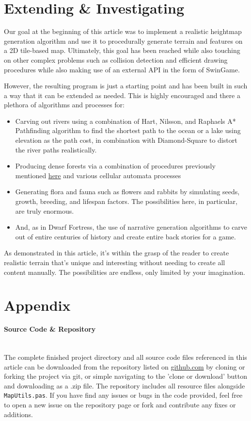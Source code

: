 \documentclass{article}
\begin{document}
\section{Extending \& Investigating}
Our goal at the beginning of this article was to implement a realistic heightmap generation algorithm and use it to procedurally generate terrain and features on a 2D tile-based map. Ultimately, this goal has been reached while also touching on other complex problems such as collision detection and efficient drawing procedures while also making use of an external API in the form of SwinGame.
\par
However, the resulting program is just a starting point and has been built in such a way that it can be extended as needed. This is highly encouraged and there a plethora of algorithms and processes for:
\begin{itemize}
\item
Carving out rivers using a combination of Hart, Nilsson, and Raphaels A* Pathfinding algorithm \parencite{astar} to find the shortest path to the ocean or a lake using elevation as the path cost, in combination with Diamond-Square to distort the river paths realistically.
\item
Producing dense forests via a combination of procedures previously mentioned \hyperref[forestalgo]{here} and various cellular automata processes
\item
Generating flora and fauna such as flowers and rabbits by simulating seeds, growth, breeding, and lifespan factors. The possibilities here, in particular, are truly enormous.
\item
And, as in Dwarf Fortress, the use of narrative generation algorithms to carve out of entire centuries of history and create entire back stories for a game.
\end{itemize}

As demonstrated in this article, it's within the grasp of the reader to create realistic terrain that's unique and interesting without needing to create all content manually. The possibilities are endless, only limited by your imagination.

\printbibliography

\appendix
\setcounter{secnumdepth}{0}
\section{Appendix}
\paragraph{\large Source Code \& Repository} ~\\
The complete finished project directory and all source code files referenced in this article can be downloaded from the repository listed on \href{https://github.com/jacobmilligan/intro_hd_report}{github.com} by cloning or forking the project via git, or simple navigating to the 'clone or download' button and downloading as a .zip file. The repository includes all resource files alongside \texttt{MapUtils.pas}. If you have find any issues or bugs in the code provided, feel free to open a new issue on the repository page or fork and contribute any fixes or additions.
\end{document}
